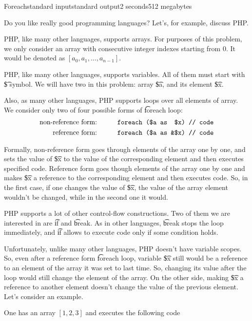 \begin{problem}{Foreach}{standard input}{standard output}{2 seconds}{512 megabytes}

Do you like really good programming languages?  Let's, for example, discuss PHP.

PHP, like many other languages, supports arrays. For purposes of this problem, we only consider an array with consecutive integer indexes starting from 0. It would be denoted as $[a_0, a_1, \dots, a_{n-1}]$.

PHP, like many other languages, supports variables. All of them must start with \t{\$} symbol. We will have two in this problem: array \t{\$a}, and its element \t{\$x}.

Also, as many other languages, PHP supports loops over all elements of array. We consider only two of four possible forms of \t{foreach} loop:
\begin{align*}
\text{non-reference form:\hspace{3em}} & \texttt{foreach (\$a as~~\$x) // code} \\
\text{reference form:\hspace{3em}} & \texttt{foreach (\$a as~\&\$x) // code}
\end{align*}

Formally, non-reference form goes through elements of the array one by one, and sets the value of \t{\$x} to the value of the corresponding element and then executes specified code. Reference form goes though elements of the array one by one and makes \t{\$x} a reference to the corresponding element and then executes code. So, in the first case, if one changes the value of \t{\$x}, the value of the array element wouldn't be changed, while in the second one it would.

PHP supports a lot of other control-flow constructions. Two of them we are interested in are \t{if} and \t{break}. As in other languages, \t{break} stops the loop immediately, and \t{if} allows to execute code only if some condition holds.

Unfortunately, unlike many other languages, PHP doesn't have variable scopes. So, even after a reference form \t{foreach} loop, variable \t{\$x} still would be a reference to an element of the array it was set to last time. So, changing its value after the loop would still change the element of the array. On the other side, making \t{\$x} a reference to another element doesn't change the value of the previous element. Let's consider an example.

One has an array $[1, 2, 3]$ and executes the following code 


\end{problem}
